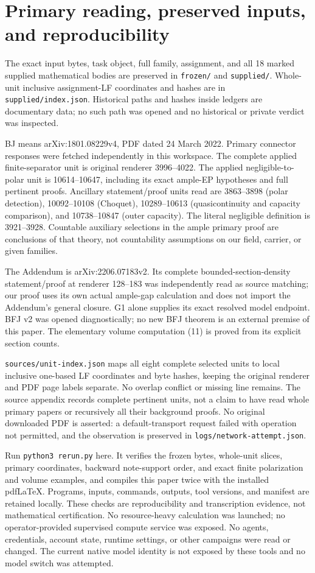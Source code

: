 \documentclass[10pt]{article}
\begin{document}
\appendix
\section{Primary reading, preserved inputs, and reproducibility}
The exact input bytes, task object, full family, assignment, and all
18 marked supplied mathematical bodies are preserved in
\texttt{frozen/} and \texttt{supplied/}. Whole-unit inclusive
assignment-LF coordinates and hashes are in \texttt{supplied/index.json}.
Historical paths and hashes inside ledgers are documentary data; no
such path was opened and no historical or private verdict was inspected.

BJ means arXiv:1801.08229v4, PDF dated 24 March 2022. Primary
connector responses were fetched independently in this workspace.
The complete applied finite-separator unit is original renderer
3996--4022. The applied negligible-to-polar unit is 10614--10647,
including its exact ample-EP hypotheses and full pertinent proofs.
Ancillary statement/proof units read are 3863--3898 (polar detection),
10092--10108 (Choquet), 10289--10613 (quasicontinuity and capacity
comparison), and 10738--10847 (outer capacity). The literal
negligible definition is 3921--3928. Countable auxiliary selections
in the ample primary proof are conclusions of that theory, not
countability assumptions on our field, carrier, or given families.

The Addendum is arXiv:2206.07183v2. Its complete bounded-section-density
statement/proof at renderer 128--183 was independently read as source
matching; our proof uses its own actual ample-gap calculation and does
not import the Addendum's general closure. G1 alone supplies its exact
resolved model endpoint. BFJ v2 was opened diagnostically; no new
BFJ theorem is an external premise of this paper. The elementary
volume computation (11) is proved from its explicit section counts.

\texttt{sources/unit-index.json} maps all eight complete selected units
to local inclusive one-based LF coordinates and byte hashes, keeping
the original renderer and PDF page labels separate. No overlap conflict
or missing line remains. The source appendix records complete pertinent
units, not a claim to have read whole primary papers or recursively
all their background proofs. No original downloaded PDF is asserted:
a default-transport request failed with operation not permitted, and
the observation is preserved in \texttt{logs/network-attempt.json}.

Run \texttt{python3 rerun.py} here. It verifies the frozen bytes,
whole-unit slices, primary coordinates, backward note-support order,
and exact finite polarization and volume examples, and compiles this
paper twice with the installed pdfLaTeX. Programs, inputs, commands,
outputs, tool versions, and manifest are retained locally. These
checks are reproducibility and transcription evidence, not mathematical
certification. No resource-heavy calculation was launched; no
operator-provided supervised compute service was exposed. No agents,
credentials, account state, runtime settings, or other campaigns
were read or changed. The current native model identity is not
exposed by these tools and no model switch was attempted.
\end{document}
